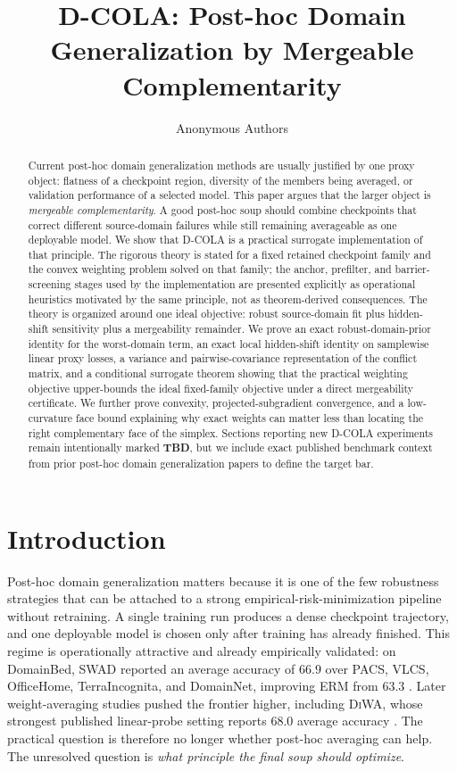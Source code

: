 \documentclass{article}
\title{D-COLA: Post-hoc Domain Generalization by Mergeable Complementarity}
\author{Anonymous Authors}
\theoremstyle{definition}
\newcommand{\TBD}{\textbf{TBD}}
\newcommand{\dcola}{\textup{\textsc{D-COLA}}}
\newcommand{\swad}{\textup{\textsc{SWAD}}}
\newcommand{\diwa}{\textup{\textsc{DiWA}}}
\newcommand{\erm}{\textup{\textsc{ERM}}}
\begin{document}
\maketitle

\begin{abstract}
Current post-hoc domain generalization methods are usually justified by one proxy object: flatness of a checkpoint region, diversity of the members being averaged, or validation performance of a selected model. This paper argues that the larger object is \emph{mergeable complementarity}. A good post-hoc soup should combine checkpoints that correct different source-domain failures while still remaining averageable as one deployable model. We show that \dcola{} is a practical surrogate implementation of that principle. The rigorous theory is stated for a fixed retained checkpoint family and the convex weighting problem solved on that family; the anchor, prefilter, and barrier-screening stages used by the implementation are presented explicitly as operational heuristics motivated by the same principle, not as theorem-derived consequences. The theory is organized around one ideal objective: robust source-domain fit plus hidden-shift sensitivity plus a mergeability remainder. We prove an exact robust-domain-prior identity for the worst-domain term, an exact local hidden-shift identity on samplewise linear proxy losses, a variance and pairwise-covariance representation of the conflict matrix, and a conditional surrogate theorem showing that the practical weighting objective upper-bounds the ideal fixed-family objective under a direct mergeability certificate. We further prove convexity, projected-subgradient convergence, and a low-curvature face bound explaining why exact weights can matter less than locating the right complementary face of the simplex. Sections reporting new \dcola{} experiments remain intentionally marked \TBD{}, but we include exact published benchmark context from prior post-hoc domain generalization papers to define the target bar.
\end{abstract}

\section{Introduction}

Post-hoc domain generalization matters because it is one of the few robustness strategies that can be attached to a strong empirical-risk-minimization pipeline without retraining. A single training run produces a dense checkpoint trajectory, and one deployable model is chosen only after training has already finished. This regime is operationally attractive and already empirically validated: on DomainBed, \swad{} reported an average accuracy of \(66.9\) over PACS, VLCS, OfficeHome, TerraIncognita, and DomainNet, improving \erm{} from \(63.3\) \citep{cha2021swad}. Later weight-averaging studies pushed the frontier higher, including \diwa{}, whose strongest published linear-probe setting reports \(68.0\) average accuracy \citep{rame2022diwa}. The practical question is therefore no longer whether post-hoc averaging can help. The unresolved question is \emph{what principle the final soup should optimize}.
\end{document}
